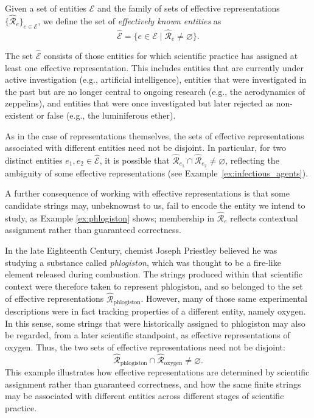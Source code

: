 \begin{definition}
Given a set of entities $\mathcal{E}$ and the family of sets of effective representations $\{\hat{\mathcal{R}}_e\}_{e \in \mathcal{E}}$, we define the set of \emph{effectively known entities} as
\[
\hat{\mathcal{E}} = \{ e \in \mathcal{E} \mid \hat{\mathcal{R}}_e \neq \varnothing \}.
\]
\end{definition}

The set $\hat{\mathcal{E}}$ consists of those entities for which scientific practice has assigned at least one effective representation. This includes entities that are currently under active investigation (e.g., artificial intelligence), entities that were investigated in the past but are no longer central to ongoing research (e.g., the aerodynamics of zeppelins), and entities that were once investigated but later rejected as non-existent or false (e.g., the luminiferous ether).

As in the case of representations themselves, the sets of effective representations associated with different entities need not be disjoint. In particular, for two distinct entities $e_1, e_2 \in \hat{\mathcal{E}}$, it is possible that $\hat{\mathcal{R}}_{e_1} \cap \hat{\mathcal{R}}_{e_2} \neq \varnothing$, reflecting the ambiguity of some effective representations (see Example~\ref{ex:infectious_agents}).

A further consequence of working with effective representations is that some candidate strings may, unbeknownst to us, fail to encode the entity we intend to study, as Example \ref{ex:phlogiston} shows; membership in $\hat{\mathcal{R}}_e$ reflects contextual assignment rather than guaranteed correctness.

\begin{example}
\label{ex:phlogiston}
In the late Eighteenth Century, chemist Joseph Priestley believed he was studying a substance called \emph{phlogiston}, which was thought to be a fire-like element released during combustion. The strings produced within that scientific context were therefore taken to represent phlogiston, and so belonged to the set of effective representations \(\hat{\mathcal{R}}_{\text{phlogiston}}\). However, many of those same experimental descriptions were in fact tracking properties of a different entity, namely oxygen. In this sense, some strings that were historically assigned to phlogiston may also be regarded, from a later scientific standpoint, as effective representations of oxygen. Thus, the two sets of effective representations need not be disjoint:
\[
\hat{\mathcal{R}}_{\text{phlogiston}} \cap \hat{\mathcal{R}}_{\text{oxygen}} \neq \varnothing.
\]
This example illustrates how effective representations are determined by scientific assignment rather than guaranteed correctness, and how the same finite strings may be associated with different entities across different stages of scientific practice.
\end{example}

